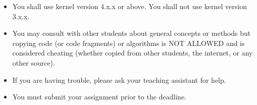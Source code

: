 \documentclass{article}
\begin{document}
\begin{itemize}
    \item You shall use kernel version 4.x.x or above. You shall not use kernel version 3.x.x.
    \item You may consult with other students about general concepts or methods but copying code (or code fragments) or algorithms is NOT ALLOWED and is considered cheating (whether copied from other students, the internet, or any other source).
    \item If you are having trouble, please ask your teaching assistant for help.
    \item You must submit your assignment prior to the deadline.
\end{itemize}
\end{document}

